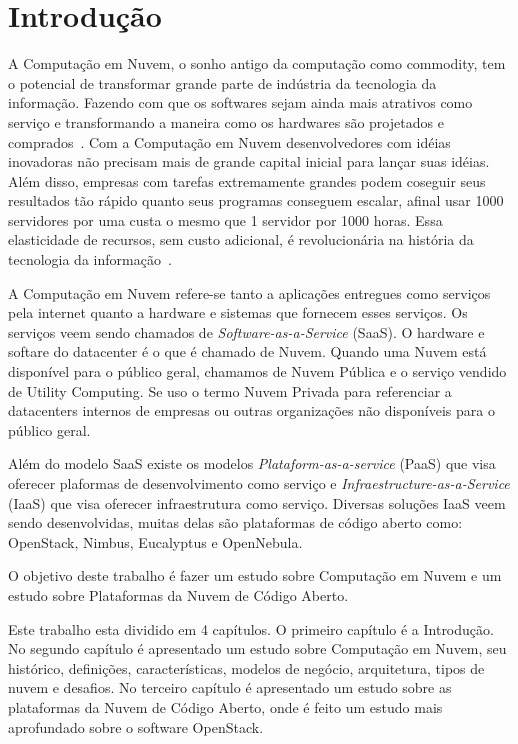 \chapter{Introdução}

A Computação em Nuvem, o sonho antigo da computação como commodity, tem o potencial de transformar grande parte de indústria da tecnologia da informação. Fazendo com que os softwares sejam ainda mais atrativos como serviço e transformando a maneira como os hardwares são projetados e comprados~\cite{Armbrust:2009}. Com a Computação em Nuvem desenvolvedores com idéias inovadoras não precisam mais de grande capital inicial para lançar suas idéias. Além disso, empresas com tarefas extremamente grandes podem coseguir seus resultados tão rápido quanto seus programas conseguem escalar, afinal usar 1000 servidores por uma custa o mesmo que 1 servidor por 1000 horas. Essa elasticidade de recursos, sem custo adicional, é revolucionária na história da tecnologia da informação~\cite{Armbrust:2009}.

A Computação em Nuvem refere-se tanto a aplicações entregues como serviços pela internet quanto a hardware e sistemas que fornecem esses serviços. Os serviços veem sendo chamados de \textit{Software-as-a-Service} (SaaS). O hardware e softare do datacenter é o que é chamado de Nuvem. Quando uma Nuvem está disponível para o público geral, chamamos de Nuvem Pública e o serviço vendido de Utility Computing. Se uso o termo Nuvem Privada para referenciar a datacenters internos de empresas ou outras organizações não disponíveis para o público geral. 

Além do modelo SaaS existe os modelos \textit{Plataform-as-a-service} (PaaS) que visa oferecer plaformas de desenvolvimento como serviço e \textit{Infraestructure-as-a-Service} (IaaS) que visa oferecer infraestrutura como serviço. Diversas soluções IaaS veem sendo desenvolvidas, muitas delas são plataformas de código aberto como: OpenStack, Nimbus, Eucalyptus e OpenNebula.

O objetivo deste trabalho é fazer um estudo sobre Computação em Nuvem e um estudo sobre Plataformas da Nuvem de Código Aberto. 


Este trabalho esta dividido em 4 capítulos. O primeiro capítulo é a Introdução. No segundo capítulo é apresentado um estudo sobre Computação em Nuvem, seu histórico, definições, características, modelos de negócio, arquitetura, tipos de nuvem e desafios. No terceiro capítulo é apresentado um estudo sobre as plataformas da Nuvem de Código Aberto, onde é feito um estudo mais aprofundado sobre o software OpenStack.
